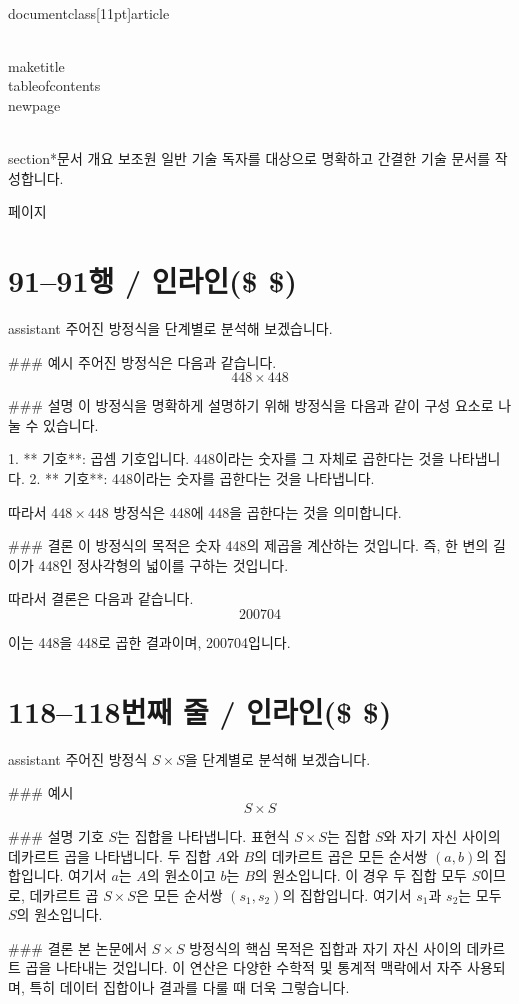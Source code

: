 \\documentclass[11pt]{article}
\begin{document}
\\maketitle
\\tableofcontents
\\newpage

\\section*{문서 개요}
보조원
일반 기술 독자를 대상으로 명확하고 간결한 기술 문서를 작성합니다.

\새 페이지

\section*{91–91행 / 인라인(\$ \$) }
assistant
주어진 방정식을 단계별로 분석해 보겠습니다.

### 예시
주어진 방정식은 다음과 같습니다.
\[ 448 \times 448 \]

### 설명
이 방정식을 명확하게 설명하기 위해 방정식을 다음과 같이 구성 요소로 나눌 수 있습니다.

1. ** 기호**: 곱셈 기호입니다. 448이라는 숫자를 그 자체로 곱한다는 것을 나타냅니다.
2. ** 기호**: 448이라는 숫자를 곱한다는 것을 나타냅니다.

따라서 \( 448 \times 448 \) 방정식은 448에 448을 곱한다는 것을 의미합니다.

### 결론
이 방정식의 목적은 숫자 448의 제곱을 계산하는 것입니다. 즉, 한 변의 길이가 448인 정사각형의 넓이를 구하는 것입니다.

따라서 결론은 다음과 같습니다.
\[ \boxed{200704} \]

이는 448을 448로 곱한 결과이며, 200704입니다.

\section*{118–118번째 줄 / 인라인(\$ \$) }
assistant
주어진 방정식 \( S \times S \)을 단계별로 분석해 보겠습니다.

### 예시
\[ S \times S \]

### 설명
기호 \( S \)는 집합을 나타냅니다. 표현식 \( S \times S \)는 집합 \( S \)와 자기 자신 사이의 데카르트 곱을 나타냅니다. 두 집합 \( A \)와 \( B \)의 데카르트 곱은 모든 순서쌍 \((a, b)\)의 집합입니다. 여기서 \( a \)는 \( A \)의 원소이고 \( b \)는 \( B \)의 원소입니다. 이 경우 두 집합 모두 \( S \)이므로, 데카르트 곱 \( S \times S \)은 모든 순서쌍 \((s_1, s_2)\)의 집합입니다. 여기서 \( s_1 \)과 \( s_2 \)는 모두 \( S \)의 원소입니다.

### 결론
본 논문에서 \( S \times S \) 방정식의 핵심 목적은 집합과 자기 자신 사이의 데카르트 곱을 나타내는 것입니다. 이 연산은 다양한 수학적 및 통계적 맥락에서 자주 사용되며, 특히 데이터 집합이나 결과를 다룰 때 더욱 그렇습니다.
\end{document}
